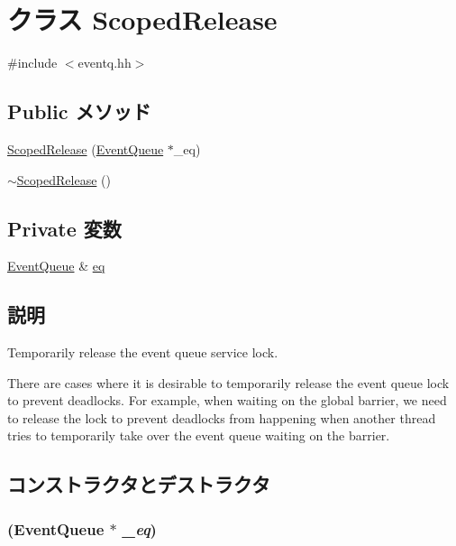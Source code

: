 \hypertarget{classEventQueue_1_1ScopedRelease}{
\section{クラス ScopedRelease}
\label{classEventQueue_1_1ScopedRelease}
}


{\ttfamily \#include $<$eventq.hh$>$}\subsection*{Public メソッド}
\begin{DoxyCompactItemize}
\item 
\hyperlink{classEventQueue_1_1ScopedRelease_aee141e4508959e15b2f7608ce966272c}{ScopedRelease} (\hyperlink{classEventQueue}{EventQueue} $\ast$\_\-eq)
\item 
\hyperlink{classEventQueue_1_1ScopedRelease_a571948d69fe8efeacfa5d8a6c7322287}{$\sim$ScopedRelease} ()
\end{DoxyCompactItemize}
\subsection*{Private 変数}
\begin{DoxyCompactItemize}
\item 
\hyperlink{classEventQueue}{EventQueue} \& \hyperlink{classEventQueue_1_1ScopedRelease_a56da388e27fa241c2f0d42fa4188f2a1}{eq}
\end{DoxyCompactItemize}


\subsection{説明}
Temporarily release the event queue service lock.

There are cases where it is desirable to temporarily release the event queue lock to prevent deadlocks. For example, when waiting on the global barrier, we need to release the lock to prevent deadlocks from happening when another thread tries to temporarily take over the event queue waiting on the barrier. 

\subsection{コンストラクタとデストラクタ}
\hypertarget{classEventQueue_1_1ScopedRelease_aee141e4508959e15b2f7608ce966272c}{
\subsubsection[{ScopedRelease}]{ ({\bf EventQueue} $\ast$ {\em \_\-eq})}}
\label{classEventQueue_1_1ScopedRelease_aee141e4508959e15b2f7608ce966272c}



